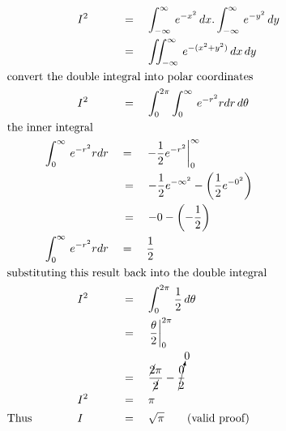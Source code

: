 \begin{alignat*}{5}
&\,&&\qquad\quad I^2&&\,=\quad\int_{-\infty}^\infty\,e^{-x^2}\,dx.\int_{-\infty}^\infty\,e^{-y^2}\,dy\\
&\,&&\,&&\,=\quad\iint_{-\infty}^\infty\,e^{-(x^2+y^2)}\,dx\,dy\\
&\rlap{\text{convert the double integral into polar coordinates}}\\
&\,&&\qquad\quad I^2&&\,=\quad\int_0^{2\pi}\int_0^\infty\,e^{-r^2}rdr\,d\theta\\
&\rlap{\text{the inner integral}}\\
&\,&&\int_0^\infty\,e^{-r^2}rdr&&=\quad\left.-\frac{1}{2}e^{-r^2}\right\vert_0^\infty\\
&\,&&\,&&\,=\quad-\frac{1}{2}e^{-\infty^2}-\left(\frac{1}{2}e^{-0^2}\right)\\
&\,&&\,&&\,=\quad-0-\left(-\frac{1}{2}\right)\\
&\,&&\int_0^\infty\,e^{-r^2}rdr&&=\quad\frac{1}{2}\\
&\rlap{\text{substituting this result back into the double integral}}\\
&\,&&\qquad\quad I^2&&\,=\quad\int_0^{2\pi}\,\frac{1}{2}\,d\theta\\
&\,&&\,&&\,=\quad\left.\frac{\theta}{2}\right\vert_0^{2\pi}\\
&\,&&\,&&\,=\quad\frac{\cancel{2}\pi}{\cancel{2}}-\cancelto{0}{\frac{0}{2}}\\
&\,&&\qquad\quad I^2&&\,=\quad\pi\\
&\text{Thus}&&\qquad\quad I&&\,=\quad\sqrt{\pi}\qquad\text{(valid proof)}
\end{alignat*}
